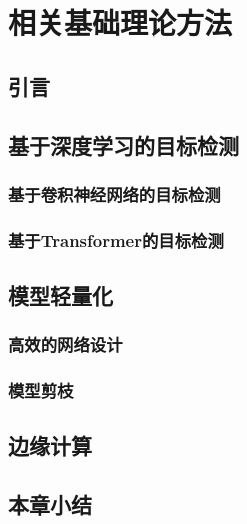 \chapter{相关基础理论方法}
\section{引言}
\section{基于深度学习的目标检测}
\subsection{基于卷积神经网络的目标检测}
\subsection{基于Transformer的目标检测}
\section{模型轻量化}
\subsection{高效的网络设计}
\subsection{模型剪枝}
\section{边缘计算}
\section{本章小结}

